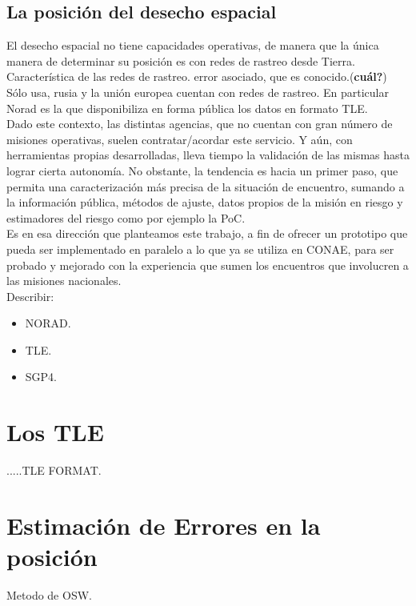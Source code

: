 \subsection*{La posici\'on del desecho espacial}
El desecho espacial no tiene capacidades operativas, de manera que la \'unica manera de determinar su posici\'on es con redes de rastreo desde Tierra.\\
Caracter\'istica de las redes de rastreo. error asociado, que es conocido.({\bf{cu\'al?}})\\
S\'olo usa, rusia y la uni\'on europea cuentan con redes de rastreo. En particular Norad es la que disponibiliza en forma p\'ublica los datos en formato TLE.\\
Dado este contexto, las distintas agencias, que no cuentan con gran n\'umero de misiones operativas, suelen contratar/acordar este servicio. Y a\'un, con herramientas propias desarrolladas, lleva tiempo la validaci\'on de las mismas hasta lograr cierta autonom\'ia. No obstante, la tendencia es hacia un primer paso, que permita una caracterizaci\'on m\'as precisa de la situaci\'on de encuentro, sumando a la informaci\'on p\'ublica, m\'etodos de ajuste, datos propios de la misi\'on en riesgo y estimadores del riesgo como por ejemplo la \ac{PoC}.\\
Es en esa direcci\'on que planteamos este trabajo, a fin de ofrecer un prototipo que pueda ser implementado en paralelo a lo que ya se utiliza en CONAE, para ser probado y mejorado con la experiencia que sumen los encuentros que involucren a las misiones nacionales.\\
Describir:\\
\begin{itemize}
\item NORAD.
\item TLE.
\item SGP4.
\end{itemize}

\section{Los TLE}

.....TLE FORMAT.

\section{Estimaci\'on de Errores en la posici\'on}
Metodo de OSW.
